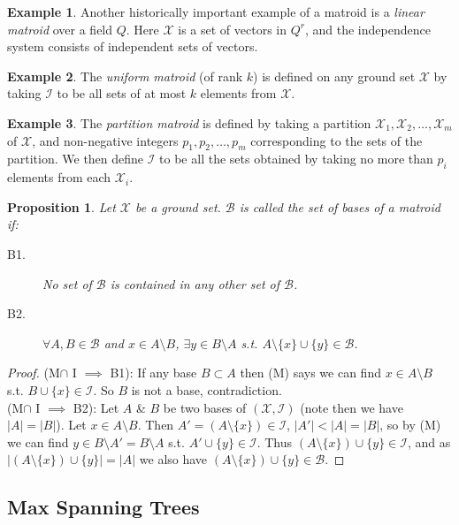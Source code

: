 \documentclass{article}
\newtheorem*{prop}{Proposition}
\theoremstyle{definition}
\newtheorem*{ex}{Example}
\newcommand{\X}{\mathcal{X}}
\newcommand{\I}{\mathcal{I}}
\newcommand{\B}{\mathcal{B}}
\begin{document}
\begin{ex}
Another historically important example of a matroid is a \emph{linear matroid} over a field $Q$.
Here $\X$ is a set of vectors in $Q^r$, and the independence system consists of independent sets of vectors.
\end{ex}

\begin{ex}
The \emph{uniform matroid} (of rank $k$) is defined on any ground set $\X$ by taking $\I$ to be all sets of at most $k$ elements from $\X$. 
\end{ex}

\begin{ex}
The \emph{partition matroid} is defined by taking a partition $\X_1,\X_2,\ldots,\X_m$ of $\X$, and non-negative integers $p_1,p_2,\ldots,p_m$ corresponding to the sets of the partition.
We then define $\I$ to be all the sets obtained by taking no more than $p_i$ elements from each $\X_i$.
\end{ex}

\begin{prop}
Let $\X$ be a ground set.
$\B$ is called the set of bases of a matroid if:
\begin{description}
	\item[B1.] No set of $\B$ is contained in any other set of $\B$.
	\item[B2.] $\forall A,B\in\B$ and $x\in A\setminus B$, $\exists y\in B\setminus A$ s.t. $A\setminus\{x\}\cup\{y\} \in \B$.
\end{description}
\end{prop}

\begin{proof}
(M$\cap$ I $\implies$ B1): If any base $B\subset A$ then (M) says we can find $x\in A\setminus B$ s.t. $B\cup\{x\}\in \I$.
So $B$ is not a base, contradiction. \\
(M$\cap$ I $\implies$ B2): Let $A$ \& $B$ be two bases of $(\X,\I)$ (note then we have $|A| = |B|$).
Let $x\in A\setminus B$.
Then $A' = (A\setminus\{x\})\in \I$, $|A'|<|A| = |B|$, so by (M) we can find $y\in B\setminus A' = B\setminus A$ s.t. $A'\cup \{y\}\in\I$.
Thus $(A\setminus\{x\})\cup\{y\}\in\I$, and as $|(A\setminus\{x\})\cup\{y\}|=|A|$ we also have $(A\setminus\{x\})\cup\{y\}\in\B$.
\end{proof} %


\subsection{Max Spanning Trees}
\end{document}
